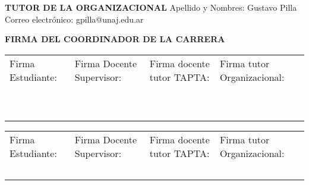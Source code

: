 \documentclass[12pt]{article}
\begin{document}
\begin{framed}
\noindent\textbf{TUTOR DE LA ORGANIZACIONAL}\newline
Apellido y Nombres: Gustavo Pilla \newline
Correo electr\'{o}nico: gpilla@unaj.edu.ar
\end{framed}

\begin{framed}
    \noindent\textbf{FIRMA DEL COORDINADOR DE LA CARRERA}
\end{framed}
\vfill
\noindent\begin{tabular}{|P{3.3cm}|P{3.3cm}|P{3.3cm}|P{3.3cm}|}
\hline
Firma Estudiante: & Firma Docente Supervisor: & Firma docente tutor TAPTA: & Firma tutor Organizacional: \\
~ & ~ & ~ & ~ \\
~ & ~ & ~ & ~ \\
\hline
\end{tabular}
\newpage

\tableofcontents
\newpage


\vfill
\noindent\begin{tabular}{|P{3.3cm}|P{3.3cm}|P{3.3cm}|P{3.3cm}|}
\hline
Firma Estudiante: & Firma Docente Supervisor: & Firma docente tutor TAPTA: & Firma tutor Organizacional: \\
~ & ~ & ~ & ~ \\
\hline
\end{tabular}


\newpage
\nocite{*}
\printbibliography

\newpage

\listoffigures
\end{document}
